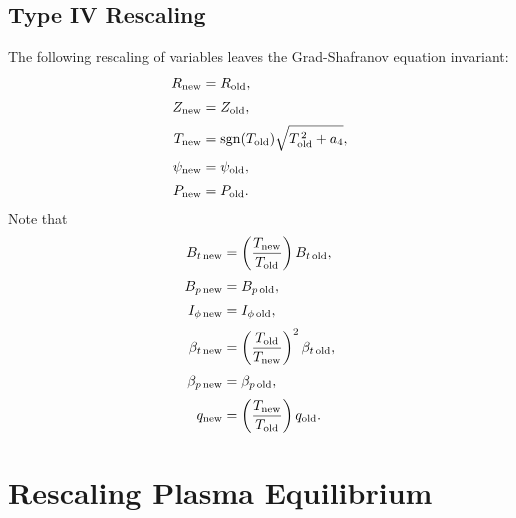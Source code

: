 \documentclass[12pt]{article}
\begin{document}
\subsection{Type IV Rescaling}
The following rescaling of variables  leaves the Grad-Shafranov equation invariant:
\begin{align}
R_{\rm new}&=R_{\rm old},\\[0.5ex]
Z_{\rm new}&=Z_{\rm old},\\[0.5ex]
T_{\rm new} &={\rm sgn}(T_{\rm old})\sqrt{T_{\rm old}^{\,2}+a_4},\\[0.5ex]
\psi_{\rm new} &=\psi_{\rm old},\\[0.5ex]
P_{\rm new} &=P_{\rm old}.
\end{align}
Note that
\begin{align}
B_{t\,{\rm new}}&= \left(\frac{T_{\rm new}}{T_{\rm old}}\right)B_{t\,{\rm old}},\\[0.5ex]
B_{p\,{\rm new}}&= B_{p\,{\rm old}},\\[0.5ex]
I_{\phi\,{\rm new}} &=I_{\phi\,{\rm old}},\\[0.5ex]
\beta_{t\,{\rm new}}&=\left(\frac{T_{\rm old}}{T_{\rm new}}\right)^2 \beta_{t\,{\rm old}},\\[0.5ex]
\beta_{p\,{\rm new}}&=\beta_{p\,{\rm old}},\\[0.5ex]
q_{\rm new} &=\left(\frac{T_{\rm new}}{T_{\rm old}}\right) q_{\rm old}.
\end{align} 

\section{Rescaling Plasma Equilibrium}
\end{document}
